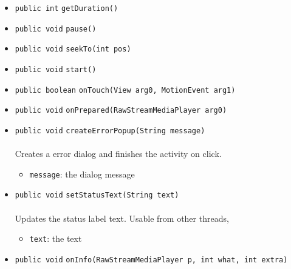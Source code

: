\begin{itemize}
\item \lstinline|public int| \lstinline|getDuration|\lstinline|()| \\[-0.6em]




\item \lstinline|public void| \lstinline|pause|\lstinline|()| \\[-0.6em]




\item \lstinline|public void| \lstinline|seekTo|\lstinline|(int pos)| \\[-0.6em]




\item \lstinline|public void| \lstinline|start|\lstinline|()| \\[-0.6em]




\item \lstinline|public boolean| \lstinline|onTouch|\lstinline|(View arg0, MotionEvent arg1)| \\[-0.6em]




\item \lstinline|public void| \lstinline|onPrepared|\lstinline|(RawStreamMediaPlayer arg0)| \\[-0.6em]




\item \lstinline|public void| \lstinline|createErrorPopup|\lstinline|(String message)|\\ \\[-0.6em]
Creates a error dialog and finishes the activity on click.
\begin{itemize}
\item \lstinline|message|: the dialog message
\end{itemize}



\item \lstinline|public void| \lstinline|setStatusText|\lstinline|(String text)|\\ \\[-0.6em]
Updates the status label text. Usable from other threads,
\begin{itemize}
\item \lstinline|text|: the text
\end{itemize}



\item \lstinline|public void| \lstinline|onInfo|\lstinline|(RawStreamMediaPlayer p, int what, int extra)| \\[-0.6em]




\end{itemize}

